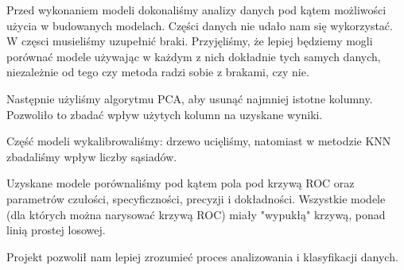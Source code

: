\documentclass{article}
\begin{document}
Przed wykonaniem modeli dokonaliśmy analizy danych pod kątem możliwości użycia w budowanych modelach. Części danych nie udało nam się wykorzystać.
W częsci musieliśmy uzupełnić braki. Przyjęliśmy, że lepiej będziemy mogli porównać modele używając w każdym z nich dokładnie tych samych danych,
niezależnie od tego czy metoda radzi sobie z brakami, czy nie.

Następnie użyliśmy algorytmu PCA, aby usunąć najmniej istotne kolumny. Pozwoliło to zbadać wpływ użytych kolumn na uzyskane wyniki.

Część modeli wykalibrowaliśmy: drzewo ucięliśmy, natomiast w metodzie KNN zbadaliśmy wpływ liczby sąsiadów.

Uzyskane modele porównaliśmy pod kątem pola pod krzywą ROC oraz parametrów czułości, specyficzności, precyzji i dokładności.
Wszystkie modele (dla których można narysować krzywą ROC) miały "wypukłą" krzywą, ponad linią prostej losowej.

Projekt pozwolił nam lepiej zrozumieć proces analizowania i klasyfikacji danych.
\end{document}
